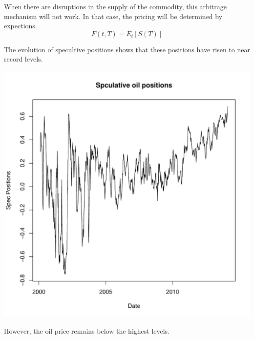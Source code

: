 \documentclass[12pt, a4paper, oneside]{article}\usepackage[]{graphicx}\usepackage[]{color}
\makeatletter
\def\maxwidth{ %
  \ifdim\Gin@nat@width>\linewidth
    \linewidth
  \else
    \Gin@nat@width
  \fi
}
\newenvironment{knitrout}{}{} %
\makeatother
\begin{document}
When there are disruptions in the supply of the commodity, this arbitrage mechanism will not work. In that case, the pricing will be determined by expections. 
\begin{equation*}
F(t, T) = E_t[S(T)]
\end{equation*}





The evolution of specultive positions shows that these positions have risen to near record levels.   
\begin{knitrout}
\color{fgcolor}

{\centering \includegraphics[width=\maxwidth]{figure/Oilspec} 

}



\end{knitrout}

However, the oil price remains below the highest levels. 
\end{document}
